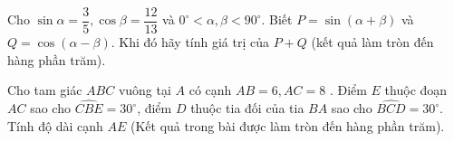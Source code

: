 \begin{ex}%
	Cho $\sin \alpha=\dfrac{3}{5}, \cos \beta=\dfrac{12}{13}$ và $0^{\circ} < \alpha, \beta < 90^{\circ}$. Biết $P=\sin \left(\alpha+\beta \right)$ và $Q=\cos \left(\alpha-\beta \right)$. Khi đó hãy tính giá trị của $P+Q$ (kết  quả làm tròn đến hàng phần trăm).
\end{ex}

\begin{ex}%
	Cho tam giác $ABC$ vuông tại $A$ có cạnh $AB=6,AC=8$ . Điểm $E$ thuộc đoạn $AC$ sao cho $\widehat{CBE}=30^\circ$, điểm $D$ thuộc tia đối của tia $BA$ sao cho $\widehat{BCD}=30^\circ$. Tính độ dài cạnh $AE$ (Kết quả trong bài được  làm tròn đến hàng phần trăm).
	\begin{center}
	\end{center}
\end{ex}



